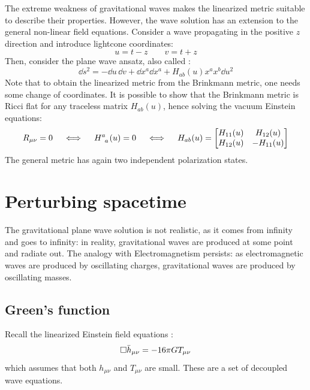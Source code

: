 The extreme weakness of gravitational waves makes the linearized metric  suitable to describe their properties. However, the wave solution has an extension to the general non-linear field equations. Consider a wave propagating in the positive $ z $ direction and introduce lightcone coordinates:
\begin{equation*}
  u = t - z
  \qquad
  v = t + z
\end{equation*}
Then, consider the plane wave ansatz, also called :
\begin{equation*}
  \dd s^2 = -\dd u\,\dd v + \dd x^a \dd x^a + H_{ab}(u) x^a x^b \dd u^2
\end{equation*}
Note that to obtain the linearized metric  from the Brinkmann metric, one needs some change of coordinates. It is possible to show that the Brinkmann metric is Ricci flat for any traceless matrix $ H_{ab}(u) $, hence solving the vacuum Einstein equations:
\begin{equation*}
  R_{\mu \nu} = 0
  \quad \iff \quad
  \tensor{H}{^a_a}(u) = 0
  \quad \iff \quad
  H_{ab}(u) =
  \begin{bmatrix}
    H_{11}(u) & H_{12}(u) \\
    H_{12}(u) & -H_{11}(u)
  \end{bmatrix}
\end{equation*}
The general metric has again two independent polarization states.

\newpage
\section{Perturbing spacetime}

The gravitational plane wave solution  is not realistic, as it comes from infinity and goes to infinity: in reality, gravitational waves are produced at some point and radiate out. The analogy with Electromagnetism persists: as electromagnetic waves are produced by oscillating charges, gravitational waves are produced by oscillating masses.

\subsection{Green's function}

Recall the linearized Einstein field equations :
\begin{equation*}
  \Box \bar{h}_{\mu \nu} = -16\pi G T_{\mu \nu}
\end{equation*}
which assumes that both $ h_{\mu \nu} $ and $ T_{\mu \nu} $ are small. These are a set of decoupled wave equations.

